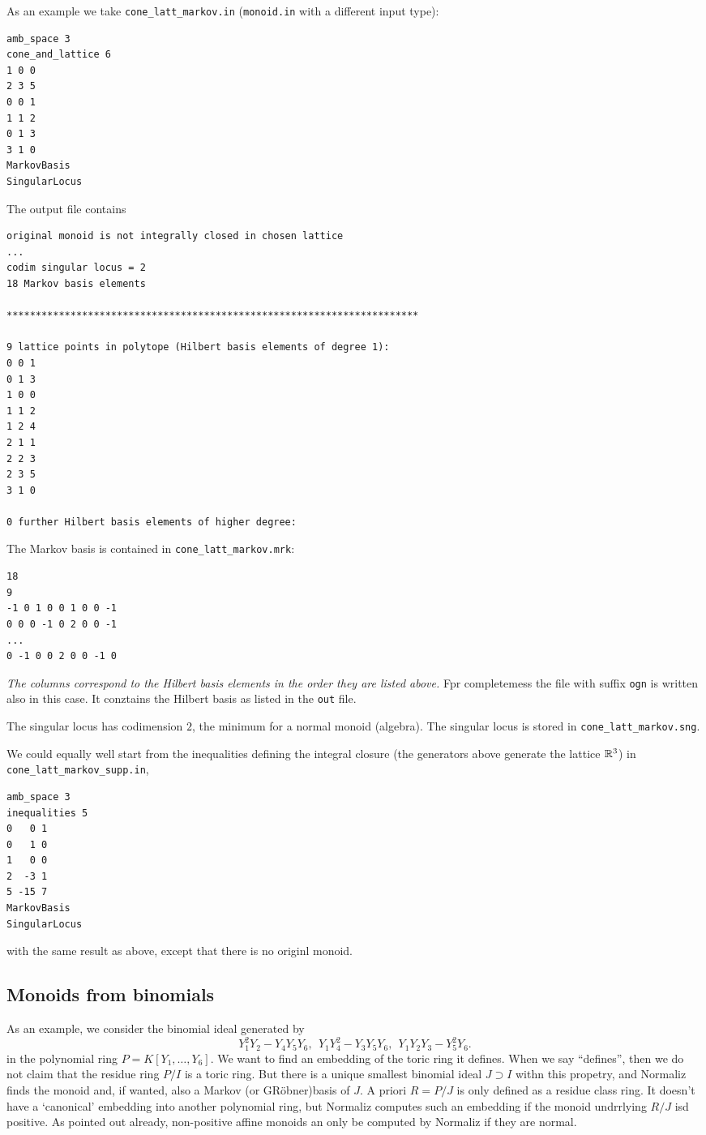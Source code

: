 As an example we take \verb|cone_latt_markov.in| (\verb|monoid.in| with a different input type):
\begin{Verbatim}
amb_space 3
cone_and_lattice 6
1 0 0
2 3 5
0 0 1
1 1 2
0 1 3
3 1 0
MarkovBasis
SingularLocus
\end{Verbatim}

The output file contains
\begin{Verbatim}
original monoid is not integrally closed in chosen lattice
...
codim singular locus = 2
18 Markov basis elements

***********************************************************************

9 lattice points in polytope (Hilbert basis elements of degree 1):
0 0 1
0 1 3
1 0 0
1 1 2
1 2 4
2 1 1
2 2 3
2 3 5
3 1 0

0 further Hilbert basis elements of higher degree:
\end{Verbatim}
The Markov basis is contained in \verb|cone_latt_markov.mrk|:
\begin{Verbatim}
18
9
-1 0 1 0 0 1 0 0 -1 
0 0 0 -1 0 2 0 0 -1 
...
0 -1 0 0 2 0 0 -1 0 
\end{Verbatim}
\emph{The columns correspond to the Hilbert basis elements in the order they are listed above.} Fpr completemess the file with suffix \verb|ogn| is written also in this case. It conztains the Hilbert basis as listed in the \verb|out| file.

The singular locus has codimension $2$, the minimum for a normal monoid (algebra). The singular locus is stored in \verb|cone_latt_markov.sng|.

We could equally well start from the inequalities defining the integral closure (the generators above generate the lattice ${\mathbb R}^3$) in \verb|cone_latt_markov_supp.in|,
\begin{Verbatim}
amb_space 3
inequalities 5
0   0 1
0   1 0
1   0 0
2  -3 1
5 -15 7
MarkovBasis
SingularLocus
\end{Verbatim}
with the same result as above, except that there is no originl monoid.

\subsection{Monoids from binomials}\label{binom_ex}

As an example, we consider the binomial ideal generated by
$$
Y_1^2Y_2-Y_4Y_5Y_6,\ \ Y_1Y_4^2-Y_3Y_5Y_6,\ \ Y_1Y_2Y_3-Y_5^2Y_6.
$$
in the polynomial ring $P=K[Y_1,\dots, Y_6]$. We want to find an embedding of the toric ring it defines. When we say ``defines'', then we do not claim that the residue ring  $P/I$ is a toric ring. But there is a unique smallest binomial ideal $J\supset I$ withn this propetry, and Normaliz finds the monoid and, if wanted, also a Markov (or GRöbner)basis of $J$. A priori $R=P/J$ is only defined as a residue class ring. It doesn't have a `canonical' embedding into another polynomial ring, but Normaliz computes such an embedding if the monoid undrrlying $R/J$ isd positive. As pointed out already, non-positive affine monoids an only be computed by Normaliz if they are normal.

